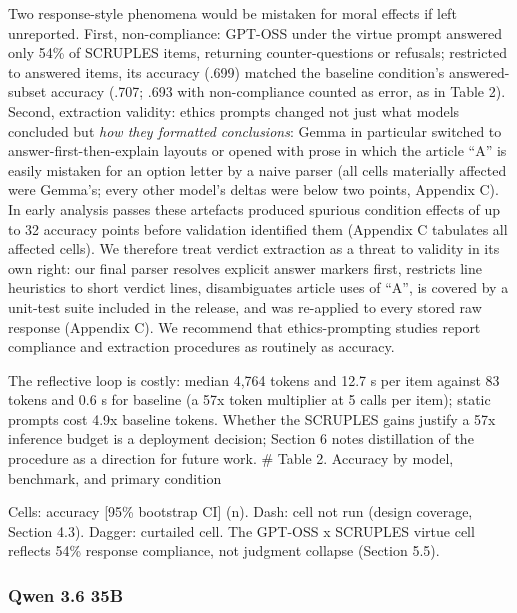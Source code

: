 \documentclass[
  11pt,
]{article}
\begin{document}
Two response-style phenomena would be mistaken for moral effects if left
unreported. First, non-compliance: GPT-OSS under the virtue prompt
answered only 54\% of SCRUPLES items, returning counter-questions or
refusals; restricted to answered items, its accuracy (.699) matched the
baseline condition's answered-subset accuracy (.707; .693 with
non-compliance counted as error, as in Table 2). Second, extraction
validity: ethics prompts changed not just what models concluded but
\emph{how they formatted conclusions}: Gemma in particular switched to
answer-first-then-explain layouts or opened with prose in which the
article ``A'' is easily mistaken for an option letter by a naive parser
(all cells materially affected were Gemma's; every other model's deltas
were below two points, Appendix C). In early analysis passes these
artefacts produced spurious condition effects of up to 32 accuracy
points before validation identified them (Appendix C tabulates all
affected cells). We therefore treat verdict extraction as a threat to
validity in its own right: our final parser resolves explicit answer
markers first, restricts line heuristics to short verdict lines,
disambiguates article uses of ``A'', is covered by a unit-test suite
included in the release, and was re-applied to every stored raw response
(Appendix C). We recommend that ethics-prompting studies report
compliance and extraction procedures as routinely as accuracy.

The reflective loop is costly: median 4,764 tokens and 12.7 s per item
against 83 tokens and 0.6 s for baseline (a 57x token multiplier at 5
calls per item); static prompts cost 4.9x baseline tokens. Whether the
SCRUPLES gains justify a 57x inference budget is a deployment decision;
Section 6 notes distillation of the procedure as a direction for future
work. \# Table 2. Accuracy by model, benchmark, and primary condition

Cells: accuracy {[}95\% bootstrap CI{]} (n). Dash: cell not run (design
coverage, Section 4.3). Dagger: curtailed cell. The GPT-OSS x SCRUPLES
virtue cell reflects 54\% response compliance, not judgment collapse
(Section 5.5).

\subsubsection{Qwen 3.6 35B}\label{qwen-3.6-35b}
\end{document}
